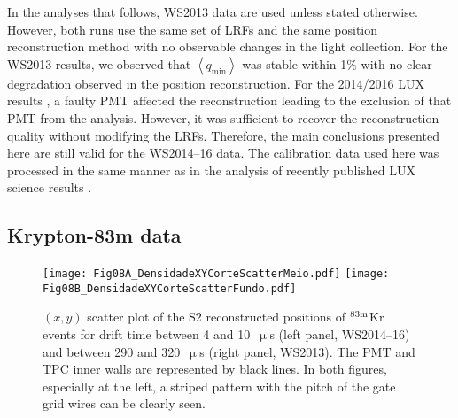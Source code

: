 \documentclass[a4paper,11pt]{article}
\begin{document}
In the analyses that follows, WS2013 data are used unless stated otherwise. However, both runs use the same set of LRFs and the same position reconstruction method with no observable changes in the light collection. For the WS2013 results, we observed that $\left<q_{\mathrm{min}}\right>$ was stable within 1\% with no clear degradation observed in the position reconstruction. For the 2014/2016 LUX results \cite{LUX2016_SSR}, a faulty PMT affected the reconstruction  leading to the exclusion of that PMT from the analysis. However, it was sufficient to recover the reconstruction quality without modifying the LRFs. Therefore, the main conclusions presented here are still valid for the WS2014--16 data. The calibration data used here was processed in the same manner as in the analysis of recently published LUX science results \cite{LUX2015_ReanalysisPRL,LUX2016_SSR}.

\subsection{Krypton-83m data\label{section_krypton_calibrations}}

\begin{figure*}
\begin{center}
\texttt{[image: Fig08A\_DensidadeXYCorteScatterMeio.pdf]}
\texttt{[image: Fig08B\_DensidadeXYCorteScatterFundo.pdf]}	
\caption{$(x, y)$ scatter plot of the S2 reconstructed positions of $^{\rm 83m}$Kr events for drift time between 4 and 10~$\upmu$s (left panel, WS2014--16) and between 290 and 320~$\upmu$s (right panel, WS2013). The PMT and TPC inner walls are represented by black lines. In both figures, especially at the left, a striped pattern with the pitch of the gate grid wires can be clearly seen.}
\label{Fig14_DensidadeXYCorteScatter}
\end{center}
\end{figure*}
\end{document}

